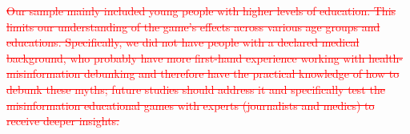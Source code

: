 \textcolor{red}{\sout{Our sample mainly included young people with higher levels of education. This limits our understanding of the game’s effects across various age groups and educations. Specifically, we did not have people with a declared medical background, who probably have more first-hand experience working with health-misinformation debunking and therefore have the practical knowledge of how to debunk these myths; future studies should address it and specifically test the misinformation educational games with experts (journalists and medics) to receive deeper insights.} }

